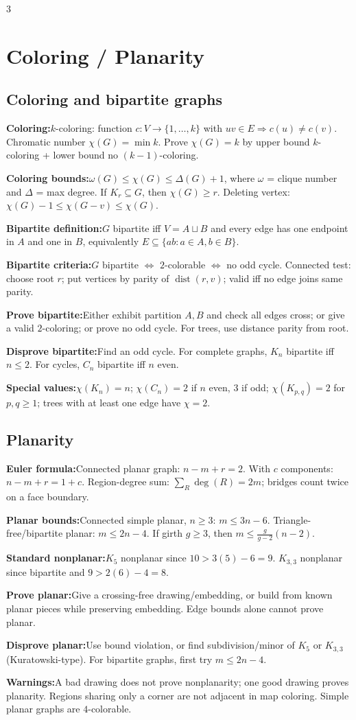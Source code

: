 \documentclass[10pt]{article}
\newcommand{\dist}{\operatorname{dist}}
\newenvironment{cheatitems}{\par\vspace{-1pt}}{\par\vspace{-1pt}}
\newcommand{\cheatrow}[2]{\par\noindent\textbf{#1:}\enspace #2\par}
\begin{document}
\begin{multicols}{3}
\section*{Coloring / Planarity}
\subsection*{Coloring and bipartite graphs}
\begin{cheatitems}
\cheatrow{Coloring}{$k$-coloring: function $c:V\to\{1,\ldots,k\}$ with $uv\in E\Rightarrow c(u)\ne c(v)$. Chromatic number $\chi(G)=\min k$. Prove $\chi(G)=k$ by upper bound $k$-coloring + lower bound no $(k-1)$-coloring.}
\cheatrow{Coloring bounds}{$\omega(G)\le\chi(G)\le\Delta(G)+1$, where $\omega$ = clique number and $\Delta$ = max degree. If $K_r\subseteq G$, then $\chi(G)\ge r$. Deleting vertex: $\chi(G)-1\le\chi(G-v)\le\chi(G)$.}
\cheatrow{Bipartite definition}{$G$ bipartite iff $V=A\sqcup B$ and every edge has one endpoint in $A$ and one in $B$, equivalently $E\subseteq\{ab:a\in A,b\in B\}$.}
\cheatrow{Bipartite criteria}{$G$ bipartite $\iff$ $2$-colorable $\iff$ no odd cycle. Connected test: choose root $r$; put vertices by parity of $\dist(r,v)$; valid iff no edge joins same parity.}
\cheatrow{Prove bipartite}{Either exhibit partition $A,B$ and check all edges cross; or give a valid $2$-coloring; or prove no odd cycle. For trees, use distance parity from root.}
\cheatrow{Disprove bipartite}{Find an odd cycle. For complete graphs, $K_n$ bipartite iff $n\le2$. For cycles, $C_n$ bipartite iff $n$ even.}
\cheatrow{Special values}{$\chi(K_n)=n$; $\chi(C_n)=2$ if $n$ even, $3$ if odd; $\chi(K_{p,q})=2$ for $p,q\ge1$; trees with at least one edge have $\chi=2$.}
\end{cheatitems}

\subsection*{Planarity}
\begin{cheatitems}
\cheatrow{Euler formula}{Connected planar graph: $n-m+r=2$. With $c$ components: $n-m+r=1+c$. Region-degree sum: $\sum_R\deg(R)=2m$; bridges count twice on a face boundary.}
\cheatrow{Planar bounds}{Connected simple planar, $n\ge3$: $m\le3n-6$. Triangle-free/bipartite planar: $m\le2n-4$. If girth $g\ge3$, then $m\le\frac{g}{g-2}(n-2)$.}
\cheatrow{Standard nonplanar}{$K_5$ nonplanar since $10>3(5)-6=9$. $K_{3,3}$ nonplanar since bipartite and $9>2(6)-4=8$.}
\cheatrow{Prove planar}{Give a crossing-free drawing/embedding, or build from known planar pieces while preserving embedding. Edge bounds alone cannot prove planar.}
\cheatrow{Disprove planar}{Use bound violation, or find subdivision/minor of $K_5$ or $K_{3,3}$ (Kuratowski-type). For bipartite graphs, first try $m\le2n-4$.}
\cheatrow{Warnings}{A bad drawing does not prove nonplanarity; one good drawing proves planarity. Regions sharing only a corner are not adjacent in map coloring. Simple planar graphs are $4$-colorable.}
\end{cheatitems}


\end{multicols}
\end{document}
